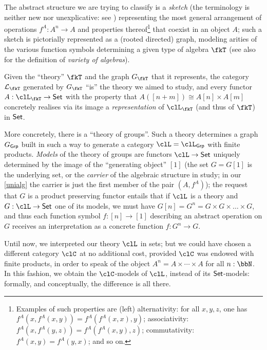 The abstract structure we are trying to classify is a \emph{sketch} (the terminology is neither new nor unexplicative: see \cite{ehresmann1968esquisses,coppey1984leccons, Bor2}) representing the most general arrangement of operations $f^A: A^n \to A$ and properties thereof\footnote{Examples of such properties are (left) alternativity: for all $x,y,z$, one has $f^A(x,f^A(x,y)) = f^A(f^A(x,x),y)$; associativity: $f^A(x,f^A(y,z)) = f^A(f^A(x,y),z)$; commutativity: $f^A(x,y)=f^A(y,x)$; and so on.} that coexist in an object $A$; such a sketch is pictorially represented as a (rooted directed) graph, modeling arities of the various function symbols determining a given type of algebra $\fkT$ (see also \cite[XV.3]{grillet2007abstract} for the definition of \emph{variety of algebras}).%

Given the ``theory'' $\fkT$ and the graph $G_{\fkT}$ that it represents, the category $\mathcal{L}_{\fkT}$ generated by $G_\fkT$ ``is'' the theory we aimed to study, and every functor $A: \clL_{\fkT} \to \Set$ with the property that $A([n+m]) \cong A[n] \times A[m]$ concretely realises via its image a \emph{representation} of $\clL_\fkT$ (and thus of $\fkT$) in $\mathsf{Set}$.
\begin{remark}\label{rmk_explicit_theoer}
	More concretely, there is a ``theory of groups''. Such a theory determines a graph $G_{\mathsf{Grp}}$ built in such a way to generate a category $\clL=\clL_{\cate{Grp}}$ with finite products. \emph{Models} of the theory of groups are functors $\clL \to \Set$ uniquely determined by the image of the ``generating object'' $[1]$ (the set $G=G[1]$ is the underlying set, or the \emph{carrier} of the algebraic structure in study; in our \autoref{unialg} the carrier is just the first member of the pair $(A,f^A)$); the request that $G$ is a product preserving functor entails that if $\clL$ is a theory and $G: \clL \to \Set$ one of its models, we must have $G[n]=G^n = G \times G \times\dots\times G$, and thus each function symbol $f: [n]\to [1]$ describing an abstract operation on $G$ receives an interpretation as a concrete function $f: G^n \to G$.
\end{remark}
Until now, we interpreted our theory $\clL$ in sets; but we could have chosen a different category $\clC$ at no additional cost, provided $\clC$ was endowed with finite products, in order to speak of the object $A^n = A\times \cdots\times A$ for all $n: \bbN$. In this fashion, we obtain the $\clC$-models of $\clL$, instead of its $\mathsf{Set}$-models: formally, and conceptually, the difference is all there.

